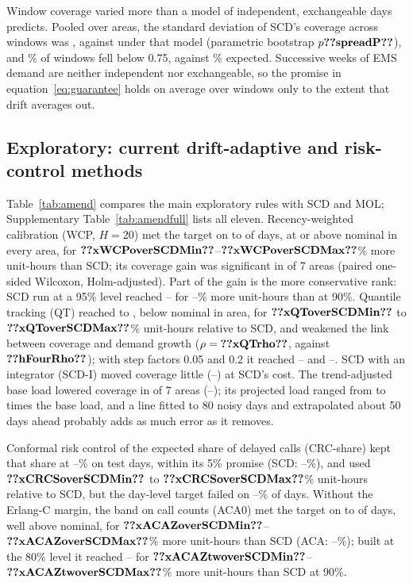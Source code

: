 \documentclass[11pt]{article}
\begin{document}
Window coverage varied more than a model of independent, exchangeable days predicts. Pooled over areas, the standard deviation of SCD's coverage across windows was , against  under that model (parametric bootstrap $p\res{spreadP}$), and \% of windows fell below 0.75, against \% expected. Successive weeks of EMS demand are neither independent nor exchangeable, so the promise in equation~\eqref{eq:guarantee} holds on average over windows only to the extent that drift averages out.

\subsection{Exploratory: current drift-adaptive and risk-control methods}

Table~\ref{tab:amend} compares the main exploratory rules with SCD and MOL; Supplementary Table~\ref{tab:amendfull} lists all eleven. Recency-weighted calibration (WCP, $H=20$) met the target on  to  of days, at or above nominal in every area, for $\res{xWCPoverSCDMin}$--$\res{xWCPoverSCDMax}$\% more unit-hours than SCD; its coverage gain was significant in  of 7 areas (paired one-sided Wilcoxon, Holm-adjusted). Part of the gain is the more conservative rank: SCD run at a 95\% level reached -- for --\% more unit-hours than at 90\%. Quantile tracking (QT) reached  to , below nominal in  area, for $\res{xQToverSCDMin}$ to $\res{xQToverSCDMax}$\% unit-hours relative to SCD, and weakened the link between coverage and demand growth ($\rho=\res{xQTrho}$, against $\res{hFourRho}$); with step factors 0.05 and 0.2 it reached -- and --. SCD with an integrator (SCD-I) moved coverage little (--) at SCD's cost. The trend-adjusted base load lowered coverage in  of 7 areas (--); its projected load ranged from  to  times the base load, and a line fitted to 80 noisy days and extrapolated about 50 days ahead probably adds as much error as it removes.

Conformal risk control of the expected share of delayed calls (CRC-share) kept that share at --\% on test days, within its 5\% promise (SCD: --\%), and used $\res{xCRCSoverSCDMin}$ to $\res{xCRCSoverSCDMax}$\% unit-hours relative to SCD, but the day-level target failed on --\% of days. Without the Erlang-C margin, the band on call counts (ACA0) met the target on  to  of days, well above nominal, for $\res{xACAZoverSCDMin}$--$\res{xACAZoverSCDMax}$\% more unit-hours than SCD (ACA: --\%); built at the 80\% level it reached -- for $\res{xACAZtwoverSCDMin}$--$\res{xACAZtwoverSCDMax}$\% more unit-hours than SCD at 90\%.
\end{document}
